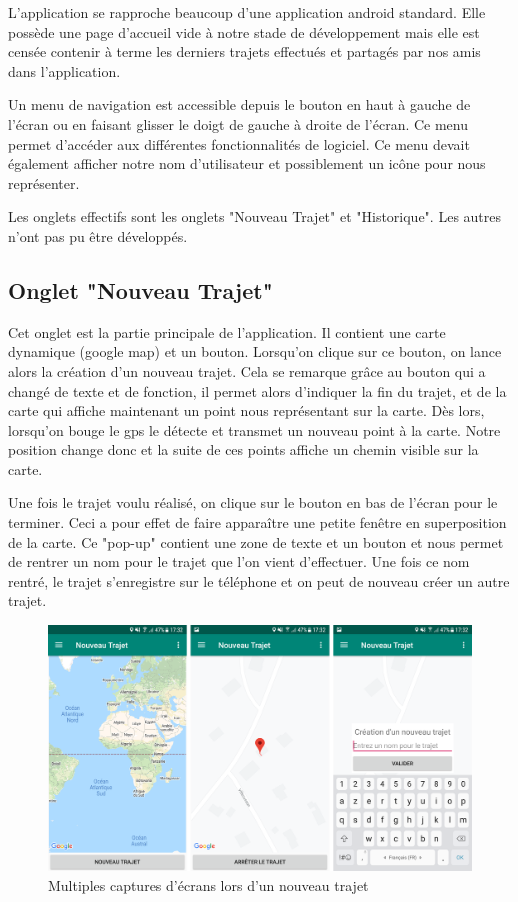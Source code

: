 \documentclass{article}
\begin{document}
L'application se rapproche beaucoup d'une application android standard. Elle possède une page d'accueil vide à notre stade de développement mais
elle est censée contenir à terme les derniers trajets effectués et partagés par nos amis dans l'application.

Un menu de navigation est accessible depuis le bouton en haut à gauche de l'écran ou en faisant glisser le doigt de gauche à droite de l'écran.
Ce menu permet d'accéder aux différentes fonctionnalités de logiciel. Ce menu devait également afficher notre nom d'utilisateur et
possiblement un icône pour nous représenter.

Les onglets effectifs sont les onglets "Nouveau Trajet" et "Historique". Les autres n'ont pas pu être développés.



\subsection{Onglet "Nouveau Trajet"}
Cet onglet est la partie principale de l'application. Il contient une carte dynamique (google map) et un bouton. Lorsqu'on clique sur ce
bouton, on lance alors la création d'un nouveau trajet. Cela se remarque grâce au bouton qui a changé de texte et de fonction, il permet
alors d'indiquer la fin du trajet, et de la carte qui affiche maintenant un point nous représentant sur la carte. Dès lors, lorsqu'on bouge
le gps le détecte et transmet un nouveau point à la carte. Notre position change donc et la suite de ces points affiche un chemin visible
sur la carte.

Une fois le trajet voulu réalisé, on clique sur le bouton en bas de l'écran pour le terminer. Ceci a pour effet de faire apparaître une
petite fenêtre en superposition de la carte. Ce "pop-up" contient une zone de texte et un bouton et nous permet de rentrer un nom pour
le trajet que l'on vient d'effectuer. Une fois ce nom rentré, le trajet s'enregistre sur le téléphone et on peut de nouveau créer un
autre trajet.
\begin{figure}[ht]
  \label{Nouveau trajet}
  \centering
  \includegraphics[scale=0.14]{images/nouveau-trajet.png}
  \caption{Multiples captures d'écrans lors d'un nouveau trajet}
\end{figure}
\end{document}
